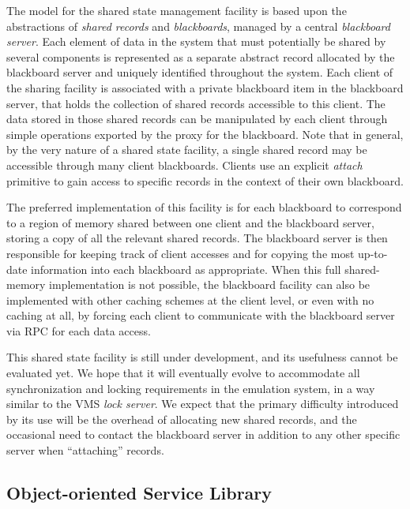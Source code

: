 {The model for the shared state management facility is based upon the
abstractions of {\em shared records} and {\em blackboards}, managed by
a central {\em blackboard server}. Each element of data in the system
that must potentially be shared by several components is represented
as a separate abstract record allocated by the blackboard server and
uniquely identified throughout the system. Each client of the sharing
facility is associated with a private blackboard item in the
blackboard server, that holds the collection of shared records
accessible to this client. The data stored in those shared records can
be manipulated by each client through simple operations exported by
the proxy for the blackboard. Note that in general, by the very nature
of a shared state facility, a single shared record may be accessible
through many client blackboards. Clients use an explicit {\em attach}
primitive to gain access to specific records in the context of their
own blackboard.

The preferred implementation of this facility is for each blackboard
to correspond to a region of memory shared between one client and the
blackboard server, storing a copy of all the relevant shared records.
The blackboard server is then responsible for keeping track of client
accesses and for copying the most up-to-date information into each
blackboard as appropriate. When this full shared-memory implementation
is not possible, the blackboard facility can also be implemented with
other caching schemes at the client level, or even with no caching at
all, by forcing each client to communicate with the blackboard server
via RPC for each data access.

This shared state facility is still under development, and its
usefulness cannot be evaluated yet. We hope that it will eventually
evolve to accommodate all synchronization and locking requirements in
the emulation system, in a way similar to the VMS {\em lock
server}\cite{DEC88B}. We expect that the primary difficulty introduced
by its use will be the overhead of allocating new shared records, and
the occasional need to contact the blackboard server in addition to
any other specific server when ``attaching'' records.

\protect}%

\subsection{Object-oriented Service Library}


